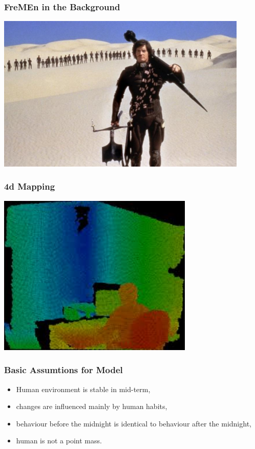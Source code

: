 
\begin{frame}
	\frametitle{FreMEn in the Background}
    \vspace{3mm}
    \href{run:./video/pitch.mkv}{\includegraphics[width=0.9\textwidth]{fig/fremen_backgroung.jpeg}}
\end{frame}


\begin{frame}
	\frametitle{4d Mapping}
    \vspace{3mm}
    \href{run:./video/MorseSpatioTemporalExploration.mp4}{\includegraphics[width=0.7\textwidth]{fig/grzegorz.jpeg}}
\end{frame}



\begin{frame}
	\frametitle{Basic Assumtions for Model}
    \vspace{3mm}
    \begin{itemize}
        \item Human environment is stable in mid-term,
        \item changes are influenced mainly by human habits,
        \item behaviour before the midnight is identical to behaviour after the midnight,
        \item human is not a point mass.
    \end{itemize}
\end{frame}



